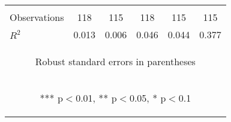 \begin{center}
\begin{tabular}{lccccc}
\vspace{4pt} & \begin{footnotesize}\end{footnotesize} & \begin{footnotesize}\end{footnotesize} & \begin{footnotesize}\end{footnotesize} & \begin{footnotesize}\end{footnotesize} & \begin{footnotesize}\end{footnotesize} \\
Observations & 118 & 115 & 118 & 115 & 115 \\
 $R^2$ & 0.013 & 0.006 & 0.046 & 0.044 & 0.377 \\ \hline
\multicolumn{6}{c}{\begin{footnotesize} Robust standard errors in parentheses\end{footnotesize}} \\
\multicolumn{6}{c}{\begin{footnotesize} *** p$<$0.01, ** p$<$0.05, * p$<$0.1\end{footnotesize}} \\
\end{tabular}
\end{center}

